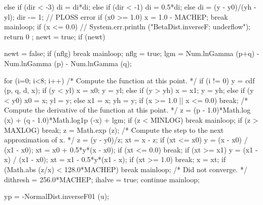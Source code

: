 \begin{code}
\begin{hide}
{{{{{                  else if (dir < -3)
                     di = di*di;
                  else if (dir < -1)
                     di = 0.5*di;
                  else
                     di = (y - y0)/(yh - yl);
                  dir -= 1;
               }
            }
            // PLOSS error
            if (x0 >= 1.0) {
               x = 1.0 - MACHEP;
               break mainloop;
            }
            if (x <= 0.0) {
            // System.err.println ("BetaDist.inverseF: underflow");
               return 0 ;
            }
            newt = true;
         }
         if (newt) {
            newt = false;
            if (nflg)
               break mainloop;
            nflg = true;
            lgm = Num.lnGamma (p+q) - Num.lnGamma (p) - Num.lnGamma (q);

            for (i=0; i<8; i++) {
               /* Compute the function at this point. */
               if (i != 0)
                  y = cdf (p, q, d, x);
               if (y < yl) {
                  x = x0;
                  y = yl;
               }
               else if (y > yh) {
                  x = x1;
                  y = yh;
               }
               else if (y < y0) {
                  x0 = x;
                  yl = y;
               }
               else {
                  x1 = x;
                  yh = y;
               }
               if (x >= 1.0 || x <= 0.0)
                  break;
               /* Compute the derivative of the function at this point. */
               z = (p - 1.0)*Math.log (x) + (q - 1.0)*Math.log1p (-x) + lgm;
               if (z < MINLOG)
                  break mainloop;
               if (z > MAXLOG)
                  break;
               z = Math.exp (z);
               /* Compute the step to the next approximation of x. */
               z = (y - y0)/z;
               xt = x - z;
               if (xt <= x0) {
                  y = (x - x0) / (x1 - x0);
                  xt = x0 + 0.5*y*(x - x0);
                  if (xt <= 0.0)
                     break;
               }
               if (xt >= x1) {
                  y = (x1 - x) / (x1 - x0);
                  xt = x1 - 0.5*y*(x1 - x);
                  if (xt >= 1.0)
                     break;
               }
               x = xt;
               if (Math.abs (z/x) < 128.0*MACHEP)
                  break mainloop;
            }
            /* Did not converge.  */
            dithresh = 256.0*MACHEP;
            ihalve = true;
            continue mainloop;
         }

         yp = -NormalDist.inverseF01 (u);

}}
\end{hide}
\end{code}
